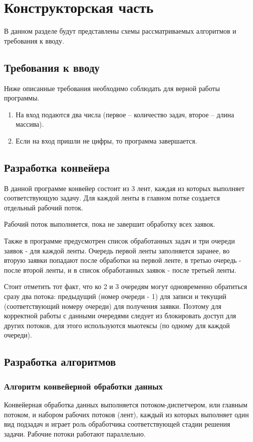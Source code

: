 \chapter{Конструкторская часть}
В данном разделе будут представлены схемы рассматриваемых алгоритмов и требования к вводу.

\section{Требования к вводу}
Ниже описанные требования необходимо соблюдать для верной работы программы.

\begin{enumerate}
	\item На вход подаются два числа (первое -- количество задач, второе -- длина массива).
	\item Если на вход пришли не цифры, то программа завершается.
\end{enumerate}

\section{Разработка конвейера}

В данной программе конвейер состоит из 3 лент, каждая из которых выполняет соответствующую задачу. Для каждой ленты в главном потке создается отдельный рабочий поток.

Рабочий поток выполняется, пока не завершит обработку всех заявок.

Также в программе предусмотрен список обработанных задач и три очереди заявок - для каждой ленты. Очередь первой ленты заполняется заранее, во вторую заявки попадают после обработки на первой ленте, в третью очередь - после второй ленты, и в список обработанных заявок - после третьей ленты.

Стоит отметить тот факт, что ко 2 и 3 очередям могут одновременно обратиться сразу два потока: предыдущий (номер очереди - 1) для записи и текущий (соответствующий номеру очереди) для получения заявки. Поэтому для корректной работы с данными очередями следует из блокировать доступ для других потоков, для этого используются мьютексы (по одному для каждой очереди).

\section{Разработка алгоритмов}

\subsection{Алгоритм конвейерной обработки данных}
Конвейерная обработка данных выполняется потоком-диспетчером, или главным потоком, и набором рабочих потоков (лент), каждый из которых выполняет один вид подзадач и играет роль обработчика соответствующей стадии решения задачи. Рабочие потоки работают параллельно. 

